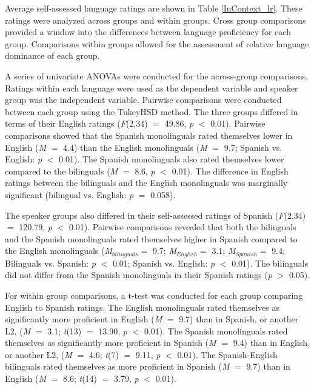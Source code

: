 


Average self-assessed language ratings are shown in Table \ref{InContext_lr}. These ratings were analyzed across groups and within groups. Cross group comparisons provided a window into the differences between language proficiency for each group. Comparisons within groups allowed for the assessment of relative language dominance of each group. 

A series of univariate ANOVAs were conducted for the across-group comparisons. Ratings within each language were used as the dependent variable and speaker group was the independent variable. Pairwise comparisons were conducted between each group using the TukeyHSD method. The three groups differed in terms of their English ratings (\textit{F}(2,34) $=$ 49.86, \textit{p} $<$ 0.01). Pairwise comparisons showed that the Spanish monolinguals rated themselves lower in English (\textit{M} $=$ 4.4) than the English monolinguals (\textit{M} $=$ 9.7; Spanish vs. English: \textit{p} $<$ 0.01). The Spanish monolinguals also rated themselves lower compared to the bilinguals (\textit{M} $=$ 8.6, \textit{p} $<$ 0.01). The difference in English ratings between the bilinguals and the English monolinguals was marginally significant (bilingual vs. English: \textit{p} $=$ 0.058). 




The speaker groups also differed in their self-assessed ratings of Spanish (\textit{F}(2,34) $=$ 120.79, \textit{p} $<$ 0.01). Pairwise comparisons revealed that both the bilinguals and the Spanish monolinguals rated themselves higher in Spanish compared to the English monolinguals (\textit{M}$_{bilinguals} =$ 9.7; \textit{M}$_{English} =$ 3.1; \textit{M}$_{Spanish} =$ 9.4; Bilinguals vs. Spanish: \textit{p} $<$ 0.01; Spanish vs. English: \textit{p} $<$ 0.01). The bilinguals did not differ from the Spanish monolinguals in their Spanish ratings (\textit{p} $>$ 0.05).
 
For within group comparisons, a t-test was conducted for each group comparing English to Spanish ratings. The English monolinguals rated themselves as significantly more proficient in English (\textit{M} $=$ 9.7) than in Spanish, or another L2, (\textit{M} $=$ 3.1; \textit{t}(13) $=$ 13.90, \textit{p} $<$ 0.01). The Spanish monolinguals rated themselves as significantly more proficient in Spanish (\textit{M} $=$ 9.4) than in English, or another L2, (\textit{M} $=$ 4.6; \textit{t}(7) $=$ 9.11, \textit{p} $<$ 0.01). The Spanish-English bilinguals rated themselves as more proficient in Spanish (\textit{M} $=$ 9.7) than in English (\textit{M} $=$ 8.6; \textit{t}(14) $=$ 3.79, \textit{p} $<$ 0.01).

